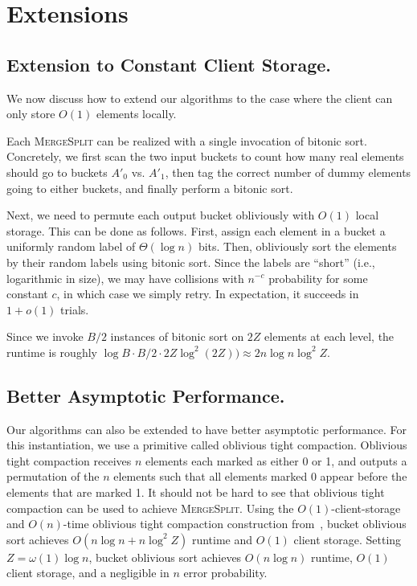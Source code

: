 
\section{Extensions}
\label{sec:extensions}

\subsection{Extension to Constant Client Storage.}
\label{sec:O1client}
We now discuss how to extend our algorithms to the case where the client can only store $O(1)$ elements locally.

Each \textsc{MergeSplit} can be realized with a single invocation of bitonic sort.
Concretely, we first scan the two input buckets to count how many real elements should go to buckets $A'_0$ vs. $A'_1$, then tag the correct number of dummy elements going to either buckets, and finally perform a bitonic sort.

Next, we need to permute each output bucket obliviously with $O(1)$ local storage. 
This can be done as follows. 
First, assign each element in a bucket a uniformly random label of $\Theta(\log n)$ bits. 
Then, obliviously sort the elements by their random labels using bitonic sort. 
Since the labels are ``short'' (i.e., logarithmic in size), we may have collisions with $n^{-c}$ probability for some constant $c$, in which case we simply retry. 
In expectation, it succeeds in $1+o(1)$ trials. 


Since we invoke $B/2$ instances of bitonic sort on $2Z$ elements at each level,
the runtime is roughly $\log B \cdot B/2 \cdot 2Z \log^2 (2Z)) \approx 2 n\log n \log^2 Z$. 

\subsection{Better Asymptotic Performance.}
Our algorithms can also be extended to have better asymptotic performance.
For this instantiation, we use a primitive called oblivious tight compaction.
Oblivious tight compaction receives $n$ elements each marked as either 0 or 1, and outputs a permutation of the $n$ elements such that all elements marked 0 appear before the elements that are marked 1. 
It should not be hard to see that oblivious tight compaction can be used to achieve \textsc{MergeSplit}.
Using the $O(1)$-client-storage and $O(n)$-time oblivious tight compaction construction from~\cite{asharov2018optorama}, bucket oblivious sort achieves $O(n\log n + n\log^2Z)$ runtime and $O(1)$ client storage.
Setting $Z=\omega(1)\log n$, bucket oblivious sort achieves $O(n\log n)$ runtime, $O(1)$ client storage, and a negligible in $n$ error probability.


